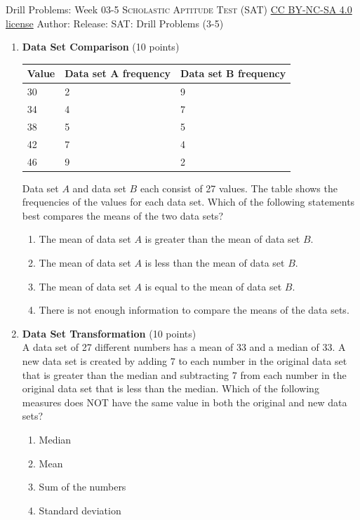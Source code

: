 \newpage\handout
{Drill Problems: Week 03-5}
{\textsc{Scholastic Aptitude Test (SAT)}}
{\href{https://creativecommons.org/licenses/by-nc-sa/4.0/}{CC BY-NC-SA 4.0 license}}
{Author: \BookAuthor}{Release: \generatedOn}
{SAT: Drill Problems (3-5)}


\begin{enumerate}
  \item \textbf{Data Set Comparison} (10 points)\\
  \begin{center}
  \begin{tabular}{|l|l|l|}
  \hline
  Value & Data set A frequency & Data set B frequency \\
  \hline
  30 & 2 & 9 \\
  \hline
  34 & 4 & 7 \\
  \hline
  38 & 5 & 5 \\
  \hline
  42 & 7 & 4 \\
  \hline
  46 & 9 & 2 \\
  \hline
  \end{tabular}
  \end{center}

  Data set $A$ and data set $B$ each consist of 27 values. The table shows the frequencies of the values for each data set. Which of the following statements best compares the means of the two data sets?
  \begin{enumerate}[label=(\Alph*)]
    \item The mean of data set $A$ is greater than the mean of data set $B$.
    \item The mean of data set $A$ is less than the mean of data set $B$.
    \item The mean of data set $A$ is equal to the mean of data set $B$.
    \item There is not enough information to compare the means of the data sets.
  \end{enumerate}
  \begin{subanswer}
  \end{subanswer}

  \item \textbf{Data Set Transformation} (10 points)\\
  A data set of 27 different numbers has a mean of 33 and a median of 33. A new data set is created by adding 7 to each number in the original data set that is greater than the median and subtracting 7 from each number in the original data set that is less than the median. Which of the following measures does NOT have the same value in both the original and new data sets?
  \begin{enumerate}[label=(\Alph*)]
    \item Median
    \item Mean
    \item Sum of the numbers
    \item Standard deviation
  \end{enumerate}
  \begin{subanswer}
  \end{subanswer}


\end{enumerate}
